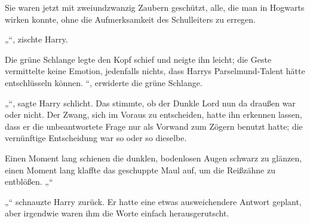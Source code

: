 Sie waren jetzt mit zweiundzwanzig Zaubern geschützt, alle, die man in Hogwarts wirken konnte, ohne die Aufmerksamkeit des Schulleiters zu erregen.

„“, zischte Harry.

Die grüne Schlange legte den Kopf schief und neigte ihn leicht; die Geste vermittelte keine Emotion, jedenfalls nichts, dass Harrys Parselmund-Talent hätte entschlüsseln können. “, erwiderte die grüne Schlange.

„“, sagte Harry schlicht. Das stimmte, ob der Dunkle Lord nun da draußen war oder nicht. Der Zwang, sich im Voraus zu entscheiden, hatte ihn erkennen lassen, dass er die unbeantwortete Frage nur als Vorwand zum Zögern benutzt hatte; die vernünftige Entscheidung war so oder so dieselbe.

Einen Moment lang schienen die dunklen, bodenlosen Augen schwarz zu glänzen, einen Moment lang klaffte das geschuppte Maul auf, um die Reißzähne zu entblößen. „“

„“ schnauzte Harry zurück. Er hatte eine etwas ausweichendere Antwort geplant, aber irgendwie waren ihm die Worte einfach herausgerutscht.

